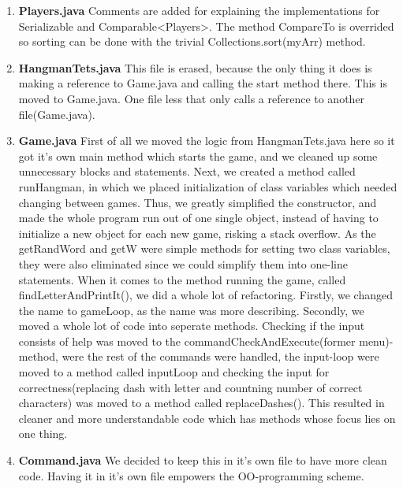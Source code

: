 \documentclass{article}
\begin{document}
\begin{enumerate}
	\item
	\textbf{Players.java}
	Comments are added for explaining the implementations for Serializable and Comparable<Players>.
	The method CompareTo is overrided so sorting can be done with the trivial Collections.sort(myArr) method.
	\item
	\textbf{HangmanTets.java}
	This file is erased, because the only thing it does is making a reference to Game.java and calling the start method there. This is moved to Game.java. One file less that only calls a reference to another file(Game.java).
	\item
	\textbf{Game.java}
	First of all we moved the logic from HangmanTets.java here so it got it's own main method which starts the game, and we cleaned up some unnecessary blocks and statements. Next, we
	created a method called runHangman, in which we placed initialization of class variables
	which needed changing between games. Thus, we greatly simplified the constructor, and
	made the whole program run out of one single object, instead of having to initialize a
	new object for each new game, risking a stack overflow. As the getRandWord and getW were 
	simple methods for setting two class variables, they were also eliminated since we could
	simplify them into one-line statements. When it comes to the method running the game, 
	called findLetterAndPrintIt(),
	we did a whole lot of refactoring. Firstly, we changed the name to gameLoop, as the name
	was more describing. Secondly, we moved a whole lot of code into seperate methods. Checking
	if the input consists of help was moved to the commandCheckAndExecute(former menu)-method, 
	were the rest of the commands were handled, the input-loop were moved to a method called
	inputLoop and checking the input for correctness(replacing dash with letter and countning 
	number of correct characters) was moved to a method called 
	replaceDashes(). This resulted in cleaner and more understandable code which has methods
	whose focus lies on one thing.

	\item
	\textbf{Command.java}
	We decided to keep this in it's own file to have more clean code. Having it in it's own file empowers the OO-programming scheme.

\end{enumerate}
\end{document}
